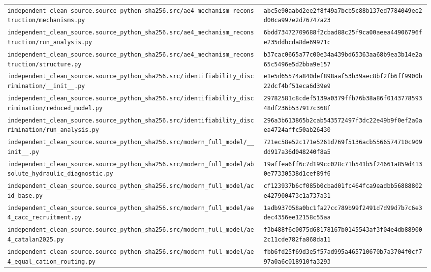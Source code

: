\begin{longtable}{p{.46\linewidth}p{.46\linewidth}}
\nolinkurl{independent_clean_source.source_python_sha256.src/ae4_mechanism_reconstruction/mechanisms.py} & \nolinkurl{abc5e90aabd2ee2f8f49a7bcb5c88b137ed7784049ee2d00ca997e2d76747a23} \\
\nolinkurl{independent_clean_source.source_python_sha256.src/ae4_mechanism_reconstruction/run_analysis.py} & \nolinkurl{6bdd73472709688f2cbad88c25f9ca00aeea44906796fe235ddbcda8de69971c} \\
\nolinkurl{independent_clean_source.source_python_sha256.src/ae4_mechanism_reconstruction/structure.py} & \nolinkurl{b37cac0665a77c00e34a439bd65363aa68b9ea3b14e2a65c5496e5d2bba9e157} \\
\nolinkurl{independent_clean_source.source_python_sha256.src/identifiability_discrimination/__init__.py} & \nolinkurl{e1e5d65574a840def898aaf53b39aec8bf2fb6ff9900b22dcf4bf51eca6d39e9} \\
\nolinkurl{independent_clean_source.source_python_sha256.src/identifiability_discrimination/reduced_model.py} & \nolinkurl{29782581c8cdef5139a0379ffb76b38a86f014377859348df236b537917c368f} \\
\nolinkurl{independent_clean_source.source_python_sha256.src/identifiability_discrimination/run_analysis.py} & \nolinkurl{296a3b613865b2cab543572497f3dc22e49b9f0ef2a0aea4724affc50ab26430} \\
\nolinkurl{independent_clean_source.source_python_sha256.src/modern_full_model/__init__.py} & \nolinkurl{721ec58e52c171e5261d769f5136acb5566574710c909dd917a36d048240f8a5} \\
\nolinkurl{independent_clean_source.source_python_sha256.src/modern_full_model/absolute_hydraulic_diagnostic.py} & \nolinkurl{19affea6ff6c7d199cc028c71b541b5f24661a859d4130e77330538d1cef89f6} \\
\nolinkurl{independent_clean_source.source_python_sha256.src/modern_full_model/acid_base.py} & \nolinkurl{cf123937b6cf085b0cbad01fc464fca9eadbb56888802e427900473c1a737a31} \\
\nolinkurl{independent_clean_source.source_python_sha256.src/modern_full_model/ae4_cacc_recruitment.py} & \nolinkurl{1adb937058a0bc1fa27cc789b99f2491d7d99d7b7c6e3dec4356ee12158c55aa} \\
\nolinkurl{independent_clean_source.source_python_sha256.src/modern_full_model/ae4_catalan2025.py} & \nolinkurl{f3b488f6c0075d68178167b0145543af3f04e4db889002c11cde782fa868da11} \\
\nolinkurl{independent_clean_source.source_python_sha256.src/modern_full_model/ae4_equal_cation_routing.py} & \nolinkurl{fbb6fd25f69d3e5f57ad995a465710670b7a3704f0cf797a0a6c018910fa3293} \\

\end{longtable}
